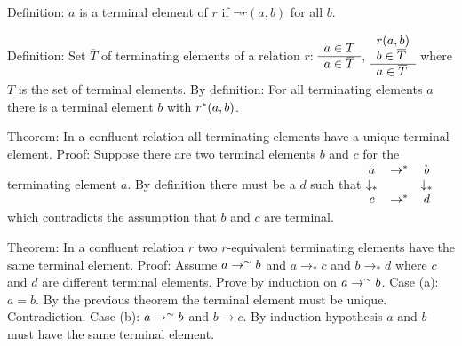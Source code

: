 Definition: $a$ is a terminal element of $r$ if $\neg r(a,b)$ for all $b$.

Definition: Set $\overline T$ of terminating elements of a relation $r$:
$\begin{array}{l} a\in T \\ \hline a\in \overline T\end{array}$, $\begin{array}{l} r(a,b) \\ b\in\overline T \\ \hline a\in
  \overline T\end{array}$ where $T$ is the set of terminal elements. By definition: For
all terminating elements $a$ there is a terminal element $b$ with $r^*(a,b)$.

Theorem: In a confluent relation all terminating elements have a unique
terminal element. Proof: Suppose there are two terminal elements $b$ and $c$
for the terminating element $a$. By definition there must be a $d$ such that
$\begin{matrix} a & \to^* & b \\
  \downarrow_* & & \downarrow_* \\
  c & \to^* & d
\end{matrix}$
which contradicts the assumption that $b$ and $c$ are terminal.


Theorem: In a confluent relation $r$ two $r$-equivalent terminating elements have the same
terminal element.
Proof: Assume $a \to^\sim b$ and $a \to_* c$ and $b \to_* d$
where $c$ and $d$ are different terminal elements. Prove by induction on $a
\to^\sim b$. Case (a): $a=b$. By the previous theorem the terminal element
must be unique. Contradiction. Case (b): $a \to^\sim b$ and $b \to c$. By
induction hypothesis $a$ and $b$ must have the same terminal element.

